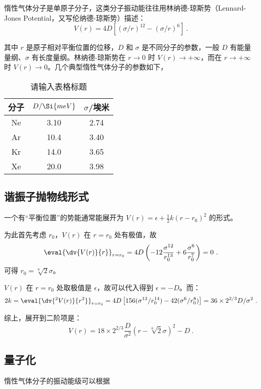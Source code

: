 
惰性气体分子是单原子分子，这类分子振动能往往用林纳德-琼斯势（Lennard-Jones Potential，又写伦纳德-琼斯势）描述：
\begin{equation}
V(r) = 4 D\left[(\sigma / r)^{12} - (\sigma/r)^6\right] ~.
\end{equation}

其中 $r$ 是原子相对平衡位置的位移，$D$ 和 $\sigma$ 是不同分子的参数，一般 $D$ 有能量量纲、$\sigma$ 有长度量纲。林纳德-琼斯势在 $r \rightarrow 0$ 时 $V(r) \rightarrow +\infty$，而在 $r \rightarrow +\infty$ 时 $V(r) \rightarrow 0$。几个典型惰性气体分子的参数如下，
\begin{table}[ht]
\centering
\caption{请输入表格标题}\label{tab_LenJoP1}
\begin{tabular}{|c|c|c|}
\hline
分子 & $D/\Si{meV}$ & $\sigma$/埃米 \\
\hline
Ne & 3.10 & 2.74 \\
\hline
Ar & 10.4 & 3.40 \\
\hline
Kr & 14.0 & 3.65 \\
\hline
Xe & 20.0 & 3.98 \\
\hline
\end{tabular}
\end{table}


\subsection{谐振子抛物线形式}
一个有“平衡位置”的势能通常能展开为 $V(r) = \epsilon + \frac{1}2 k (r-r_0)^2$ 的形式。

为此首先考虑 $r_0$，$V(r)$ 在 $r=r_0$ 处有极值，故
$$\eval{\dv{V(r)}{r}} _{r=r_0} = 4D\left(-12 \frac{\sigma^{12}}{r_0 ^{13}} + 6 \frac{\sigma^6}{r_0^7}\right) = 0~.$$
可得 $r_0 = \sqrt[6]{2} \sigma$。

$V(r)$ 在 $r=r_0$ 处取极值是 $\epsilon$，故可以代入得到 $\epsilon = -D$。而：
$$2 k = \eval{\dv{^2 V(r)}{r^2}}_{r=r_0} = 4 D \left[156 (\sigma^{12} / r_0^{14}) - 42 (\sigma^{6}/r_0^{8})\right] = 36 \times 2^{2/3} D/\sigma^2 ~.$$

综上，展开到二阶项是：
\begin{equation}
V(r) = 18 \times 2^{2/3} \frac{D}{\sigma^2} (r - \sqrt[6]{2} \sigma)^2 - D ~.
\end{equation}

\subsection{量子化}
惰性气体分子的振动能级可以根据